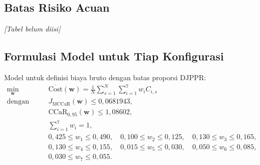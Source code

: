         \subsection{Batas Risiko Acuan}\label{subsec:risk limits}

        \begin{table}[H]
            \centering
            \caption{Batas risiko acuan $\eta$ dan $\tau$ dari portofolio eksisting (bank latih)}\label{tab:risk limits}
            \textit{[Tabel belum diisi]}
        \end{table}

        \subsection{Formulasi Model untuk Tiap Konfigurasi}\label{subsec:model per config}
        Model untuk definisi biaya bruto dengan batas proporsi DJPPR:
        \begin{equation}\label{eq:model gross djppr}
            \begin{aligned}
                \min_{\mathbf{w}} \quad & \overline{\mathrm{Cost}}(\mathbf{w}) = \frac{1}{N}\sum_{s=1}^{N}\sum_{i=1}^{7} w_i C_{i,s}\\
                \text{dengan kendala} \quad & J_{\mathrm{MCCaR}}(\mathbf{w}) \le 0{,}0681943,\\
                & \mathrm{CCaR}_{0{,}95}(\mathbf{w}) \le 1{,}08602,\\
                & \textstyle\sum_{i=1}^{7} w_i = 1,\\
                & 0{,}425 \le w_1 \le 0{,}490,\quad 0{,}100 \le w_2 \le 0{,}125,\quad 0{,}130 \le w_3 \le 0{,}165,\\
                & 0{,}130 \le w_4 \le 0{,}155,\quad 0{,}015 \le w_5 \le 0{,}030,\quad 0{,}050 \le w_6 \le 0{,}085,\\
                & 0{,}030 \le w_7 \le 0{,}055.
            \end{aligned}
        \end{equation}

